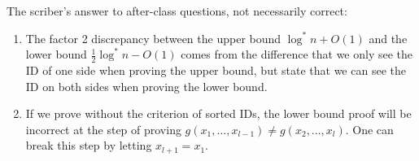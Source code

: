 \begin{remark}
  The scriber's answer to after-class questions, not necessarily correct:
  \begin{enumerate}
    \item The factor 2 discrepancy between the upper bound $\log^* n + O(1)$ and the lower bound $\frac{1}{2}\log^* n - O(1)$ comes from the difference that we only see the ID of one side when proving the upper bound, but state that we can see the ID on both sides when proving the lower bound.
    \item If we prove without the criterion of sorted IDs, the lower bound proof will be incorrect at the step of proving $g(x_1, \ldots, x_{l-1}) \neq g(x_2, \ldots, x_l)$. One can break this step by letting $x_{l+1} = x_1$.
  \end{enumerate}
\end{remark}
